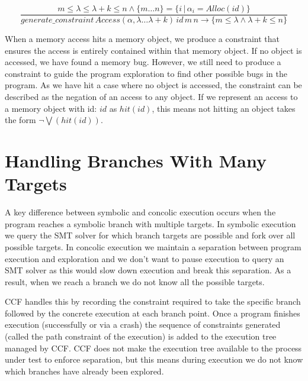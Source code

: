 \documentclass[12pt,twoside]{report}
\begin{document}
$$\frac{m \leq \lambda \leq \lambda + k \leq n \wedge \{m \dots n\} = \{ i \, | \, \alpha_i = Alloc(id)\}}{generate\_constraint\,  Access(\alpha, \lambda \dots \lambda + k) \, id \, m \, n \rightarrow \{m \leq \lambda \wedge \lambda + k \leq n\}}$$

When a memory access hits a memory object, we produce a constraint that ensures the access is entirely contained within that memory object. If no object is accessed, we have found a memory bug. However, we still need to produce a constraint to guide the program exploration to find other possible bugs in the program. As we have hit a case where no object is accessed, the constraint can be described as the negation of an access to any object. If we represent an access to a memory object with id: $id$ as $hit(id)$, this means not hitting an object takes the form $\neg\bigvee(hit(id))$.

\section{Handling Branches With Many Targets}
A key difference between symbolic and concolic execution occurs when the program reaches a symbolic branch with multiple targets. In symbolic execution we query the SMT solver for which branch targets are possible and fork over all possible targets. In concolic execution we maintain a separation between program execution and exploration and we don't want to pause execution to query an SMT solver as this would slow down execution and break this separation. As a result, when we reach a branch we do not know all the possible targets.

CCF handles this by recording the constraint required to take the specific branch followed by the concrete execution at each branch point. Once a program finishes execution (successfully or via a crash) the sequence of constraints generated (called the path constraint of the execution) is added to the execution tree managed by CCF. CCF does not make the execution tree available to the process under test to enforce separation, but this means during execution we do not know which branches have already been explored.
\end{document}
